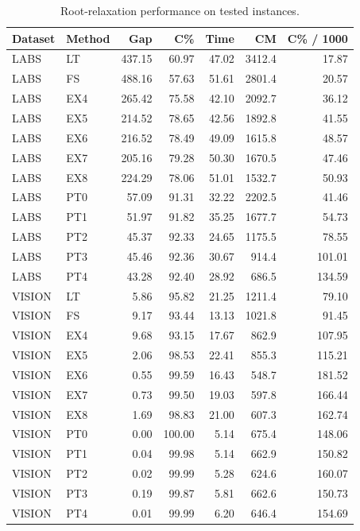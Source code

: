 \begin{table}[t]
\centering
\caption{Root-relaxation performance on tested instances.}
\label{tab:root-main-final-candidate}
\begin{tabular}{llrrrrr}
\toprule
Dataset & Method & Gap & C\% & Time & CM & C\% / 1000 \\
\midrule
LABS & LT & 437.15 & 60.97 & 47.02 & 3412.4 & 17.87 \\
LABS & FS & 488.16 & 57.63 & 51.61 & 2801.4 & 20.57 \\
LABS & EX4 & 265.42 & 75.58 & 42.10 & 2092.7 & 36.12 \\
LABS & EX5 & 214.52 & 78.65 & 42.56 & 1892.8 & 41.55 \\
LABS & EX6 & 216.52 & 78.49 & 49.09 & 1615.8 & 48.57 \\
LABS & EX7 & 205.16 & 79.28 & 50.30 & 1670.5 & 47.46 \\
LABS & EX8 & 224.29 & 78.06 & 51.01 & 1532.7 & 50.93 \\
LABS & PT0 & 57.09 & 91.31 & 32.22 & 2202.5 & 41.46  \\
LABS & PT1 & 51.97 & 91.82 & 35.25 & 1677.7 & 54.73  \\
LABS & PT2 & 45.37 & 92.33 & 24.65 & 1175.5 & 78.55  \\
LABS & PT3 & 45.46 & 92.36 & 30.67 & 914.4 & 101.01  \\
LABS & PT4 & 43.28 & 92.40 & 28.92 & 686.5 & 134.59  \\
\addlinespace
VISION & LT & 5.86 & 95.82 & 21.25 & 1211.4 & 79.10 \\
VISION & FS & 9.17 & 93.44 & 13.13 & 1021.8 & 91.45 \\
VISION & EX4 & 9.68 & 93.15 & 17.67 & 862.9 & 107.95 \\
VISION & EX5 & 2.06 & 98.53 & 22.41 & 855.3 & 115.21 \\
VISION & EX6 & 0.55 & 99.59 & 16.43 & 548.7 & 181.52 \\
VISION & EX7 & 0.73 & 99.50 & 19.03 & 597.8 & 166.44 \\
VISION & EX8 & 1.69 & 98.83 & 21.00 & 607.3 & 162.74 \\
VISION & PT0 & 0.00 & 100.00 & 5.14 & 675.4 & 148.06 \\
VISION & PT1 & 0.04 & 99.98 & 5.14 & 662.9 & 150.82 \\
VISION & PT2 & 0.02 & 99.99 & 5.28 & 624.6 & 160.07 \\
VISION & PT3 & 0.19 & 99.87 & 5.81 & 662.6 & 150.73 \\
VISION & PT4 & 0.01 & 99.99 & 6.20 & 646.4 & 154.69 \\
\bottomrule
\end{tabular}
\end{table}
